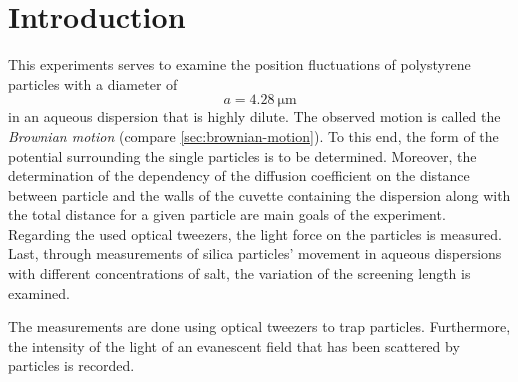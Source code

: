 \documentclass[../bericht.tex]{subfiles}
\begin{document}
  \chapter{Introduction}

    This experiments serves to examine the position fluctuations of polystyrene particles with a diameter of
    \begin{equation*}
      a=\SI{4,28}{\micro\meter}
    \end{equation*}
    in an aqueous dispersion that is highly dilute. The observed motion is called the \textit{Brownian motion} (compare \cref{sec:brownian-motion}). To this end, the form of the potential surrounding the single particles is to be determined. Moreover, the determination of the dependency of the diffusion coefficient on the distance between particle and the walls of the cuvette containing the dispersion along with the total distance for a given particle are main goals of the experiment. Regarding the used optical tweezers, the light force on the particles is measured. Last, through measurements of silica particles' movement in aqueous dispersions with different concentrations of salt, the variation of the screening length is examined.

    The measurements are done using optical tweezers to trap particles. Furthermore, the intensity of the light of an evanescent field that has been scattered by particles is recorded.
\end{document}
